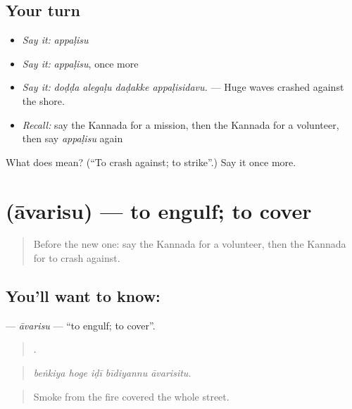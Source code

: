 \subsection*{Your turn}
\begin{itemize}
\raggedright
  \item \emph{Say it:} \emph{appaḷisu}
  \item \emph{Say it:} \emph{appaḷisu}, once more
  \item \emph{Say it:} \emph{doḍḍa alegaḷu daḍakke appaḷisidavu.} — Huge waves crashed against the shore.
  \item \emph{Recall:} say the Kannada for a mission, then the Kannada for a volunteer, then say \emph{appaḷisu} again
\end{itemize}

\begin{tcolorbox}[breakable,colback=teal!4,colframe=teal!35!black,title={Before you move on}]
What does  mean? (\textquotedblleft{}To crash against; to strike\textquotedblright{}.) Say it once more.
\end{tcolorbox}
\section[\texorpdfstring{\kn{ಆವರಿಸು} (āvarisu)}{ಆವರಿಸು (āvarisu)}]{ (āvarisu) — to engulf; to cover}

\label{lesson:KA-C351-avarisu}



\begin{quote}
Before the new one: say the Kannada for a volunteer, then the Kannada for to crash against.
\end{quote}

\subsection*{You'll want to know: }
\textbf{} — \emph{āvarisu} — \textquotedblleft{}to engulf; to cover\textquotedblright{}.

\begin{quote}
    .
\end{quote}

\begin{quote}
\emph{beṅkiya hoge iḍī bīdiyannu āvarisitu.}
\end{quote}

\begin{quote}
Smoke from the fire covered the whole street.
\end{quote}

